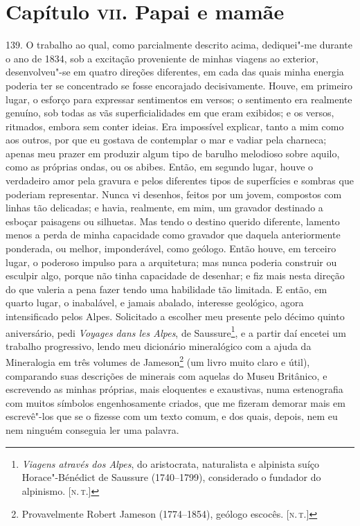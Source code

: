 \chapter{Capítulo \textsc{vii}. Papai e mamãe}

139. O trabalho ao qual, como parcialmente descrito acima, dediquei"-me
durante o ano de 1834, sob a excitação proveniente de minhas viagens ao
exterior, desenvolveu"-se em quatro direções diferentes, em cada das
quais minha energia poderia ter se concentrado se fosse encorajado
decisivamente. Houve, em primeiro lugar, o esforço para expressar
sentimentos em versos; o sentimento era realmente genuíno, sob todas as
vãs superficialidades em que eram exibidos; e os versos, ritmados,
embora sem conter ideias. Era impossível explicar, tanto a mim como aos
outros, por que eu gostava de contemplar o mar e vadiar pela charneca;
apenas meu prazer em produzir algum tipo de barulho melodioso sobre
aquilo, como as próprias ondas, ou os abibes. Então, em segundo lugar,
houve o verdadeiro amor pela gravura e pelos diferentes tipos de
superfícies e sombras que poderiam representar. Nunca vi desenhos,
feitos por um jovem, compostos com linhas tão delicadas; e havia,
realmente, em mim, um gravador destinado a esboçar paisagens ou
silhuetas. Mas tendo o destino querido diferente, lamento menos a perda
de minha capacidade como gravador que daquela anteriormente ponderada,
ou melhor, imponderável, como geólogo. Então houve, em terceiro lugar, o
poderoso impulso para a arquitetura; mas nunca poderia construir ou
esculpir algo, porque não tinha capacidade de desenhar; e fiz mais nesta
direção do que valeria a pena fazer tendo uma habilidade tão limitada. E
então, em quarto lugar, o inabalável, e jamais abalado, interesse
geológico, agora intensificado pelos Alpes. Solicitado a escolher meu
presente pelo décimo quinto aniversário, pedi \emph{Voyages dans les
Alpes}, de Saussure\footnote{\emph{Viagens através dos Alpes}, do
  aristocrata, naturalista e alpinista suíço Horace"-Bénédict de Saussure
  (1740--1799), considerado o fundador do alpinismo. {[}\textsc{n.\,t.}{]}}, e a
partir daí encetei um trabalho progressivo, lendo meu dicionário
mineralógico com a ajuda da Mineralogia em três volumes de
Jameson\footnote{Provavelmente Robert Jameson (1774--1854), geólogo
  escocês. {[}\textsc{n.\,t.}{]}} (um livro muito claro e útil), comparando
suas descrições de minerais com aquelas do Museu Britânico, e escrevendo
as minhas próprias, mais eloquentes e exaustivas, numa estenografia com
muitos símbolos engenhosamente criados, que me fizeram demorar mais em
escrevê"-los que se o fizesse com um texto comum, e dos quais, depois,
nem eu nem ninguém conseguia ler uma palavra.

